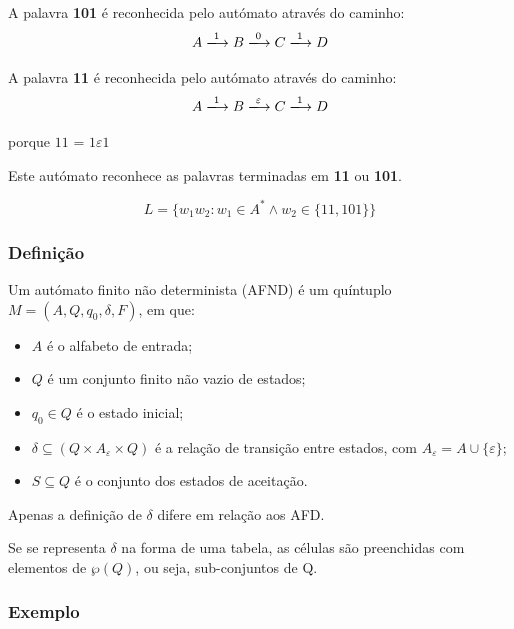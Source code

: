 \documentclass{article}
\begin{document}
\begin{flushleft}
  \item A palavra \textbf{101} é reconhecida pelo autómato através do caminho:
  \[A \xlongrightarrow{1} B \xlongrightarrow{0} C \xlongrightarrow{1} D\]

  \item A palavra \textbf{11} é reconhecida pelo autómato através do caminho:
  \[A \xlongrightarrow{1} B \xlongrightarrow{\varepsilon} C \xlongrightarrow{1} D\]
  \begin{center}
    porque $11$ = $1\varepsilon1$ 
  \end{center}

  \item  Este autómato reconhece as palavras terminadas em \textbf{11} ou \textbf{101}.
  \item \[L = \{w_1w_2 : w_1 \in A^* \wedge w_2 \in \{11, 101\}\}\]
\end{flushleft}

\subsubsection{Definição}

Um autómato finito não determinista (AFND) é um quíntuplo $M = (A, Q, q_0, \delta, F)$, em que:
\begin{itemize}
  \item $A$ é o alfabeto de entrada;
  \item $Q$ é um conjunto finito não vazio de estados;
  \item $q_0 \in Q$ é o estado inicial;
  \item $\delta \subseteq (Q \times A_\varepsilon \times Q)$ é a relação de transição entre estados, com $A_\varepsilon = A \cup \{\varepsilon\}$;
  \item $S \subseteq Q$ é o conjunto dos estados de aceitação.
\end{itemize}

\begin{flushleft}
  \item Apenas a definição de $\delta$ difere em relação aos AFD.
  \item Se se representa $\delta$ na forma de uma tabela, as células são preenchidas com elementos de
  $\wp(Q)$, ou seja, sub-conjuntos de Q.
\end{flushleft}

\pagebreak

\subsubsection{Exemplo}
\end{document}
